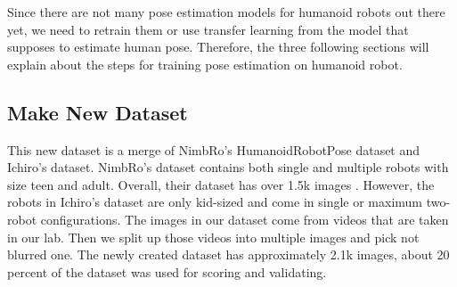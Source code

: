 
Since there are not many pose estimation models for humanoid robots out there yet, we need to retrain them or use transfer learning from the model that supposes to estimate human pose.
Therefore, the three following sections will explain about the steps for training pose estimation on humanoid robot.

\subsection{Make New Dataset}
\label{subsec:make-new-dataset}

This new dataset is a merge of NimbRo's HumanoidRobotPose dataset \citep{amini2021} and Ichiro's dataset. NimbRo's dataset contains both single and multiple robots with size teen and adult.
Overall, their dataset has over 1.5k images \citep{amini2021}.
However, the robots in Ichiro's dataset are only kid-sized and come in single or maximum two-robot configurations. The images in our dataset come from videos that are taken in our lab. 
Then we split up those videos into multiple images and pick not blurred one.
The newly created dataset has approximately 2.1k images, about 20 percent of the dataset was used for scoring and validating.

